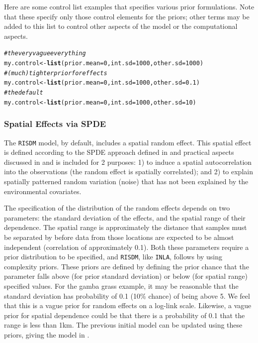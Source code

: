 \documentclass[article,shortnames,nojss]{jss}\usepackage[]{graphicx}\usepackage[]{xcolor}
\makeatletter
\newcommand{\hlnum}[1]{\textcolor[rgb]{0.686,0.059,0.569}{#1}}%
\newcommand{\hlcom}[1]{\textcolor[rgb]{0.678,0.584,0.686}{\textit{#1}}}%
\newcommand{\hlstd}[1]{\textcolor[rgb]{0.345,0.345,0.345}{#1}}%
\newcommand{\hlkwb}[1]{\textcolor[rgb]{0.69,0.353,0.396}{#1}}%
\newcommand{\hlkwc}[1]{\textcolor[rgb]{0.333,0.667,0.333}{#1}}%
\newcommand{\hlkwd}[1]{\textcolor[rgb]{0.737,0.353,0.396}{\textbf{#1}}}%
\newenvironment{kframe}{%
 \def\at@end@of@kframe{}%
 \ifinner\ifhmode%
  \def\at@end@of@kframe{\end{minipage}}%
  \begin{minipage}{\columnwidth}%
 \fi\fi%
 \def\FrameCommand##1{\hskip\@totalleftmargin \hskip-\fboxsep
 \colorbox{shadecolor}{##1}\hskip-\fboxsep
     \hskip-\linewidth \hskip-\@totalleftmargin \hskip\columnwidth}%
 \MakeFramed {\advance\hsize-\width
   \@totalleftmargin\z@ \linewidth\hsize
   \@setminipage}}%
 {\par\unskip\endMakeFramed%
 \at@end@of@kframe}
\newenvironment{knitrout}{}{} %
\makeatother
\begin{document}
Here are some control list examples that specifies various prior formulations. Note that these specify only those control elements for the priors; other terms may be added to this list to control other aspects of the model or the computational aspects.
\begin{knitrout}
\color{fgcolor}\begin{kframe}
\begin{alltt}
\hlcom{#the very vague everything}
\hlstd{my.control} \hlkwb{<-} \hlkwd{list}\hlstd{(} \hlkwc{prior.mean}\hlstd{=}\hlnum{0}\hlstd{,} \hlkwc{int.sd}\hlstd{=}\hlnum{1000}\hlstd{,} \hlkwc{other.sd}\hlstd{=}\hlnum{1000}\hlstd{)}
\hlcom{#(much) tighter prior for effects}
\hlstd{my.control} \hlkwb{<-} \hlkwd{list}\hlstd{(} \hlkwc{prior.mean}\hlstd{=}\hlnum{0}\hlstd{,} \hlkwc{int.sd}\hlstd{=}\hlnum{1000}\hlstd{,} \hlkwc{other.sd}\hlstd{=}\hlnum{0.1}\hlstd{)}
\hlcom{#the default}
\hlstd{my.control} \hlkwb{<-} \hlkwd{list}\hlstd{(} \hlkwc{prior.mean}\hlstd{=}\hlnum{0}\hlstd{,} \hlkwc{int.sd}\hlstd{=}\hlnum{1000}\hlstd{,} \hlkwc{other.sd}\hlstd{=}\hlnum{10}\hlstd{)}
\end{alltt}
\end{kframe}
\end{knitrout}

\subsubsection*{Spatial Effects via SPDE}

The \texttt{RISDM} model, by default, includes a spatial random effect. This spatial effect is defined according to the SPDE approach defined in \citet{lin11} and practical aspects discussed in \citet{lin15} and is included for 2 purposes: 1) to induce a spatial autocorrelation into the observations (the random effect is spatially correlated); and 2) to explain spatially patterned random variation (noise) that has not been explained by the environmental covariates.

The specification of the distribution of the random effects depends on two parameters: the standard deviation of the effects, and the spatial range of their dependence. The spatial range is approximately the distance that samples must be separated by before data from those locations are expected to be almost independent (correlation of approximately 0.1). Both these parameters require a prior distribution to be specified, and \texttt{RISDM}, like \texttt{INLA}, follows \citet{sim17} by using complexity priors. These priors are defined by defining the prior chance that the parameter falls above (for prior standard deviation) or below (for spatial range) specified values. For the gamba grass example, it may be reasonable that the standard deviation has probability of 0.1 (10\% chance) of being above 5. We feel that this is a vague prior for random effects on a log-link scale. Likewise, a vague prior for spatial dependence could be that there is a probability of 0.1 that the range is less than 1km. The previous initial model can be updated using these priors, giving the model in \citet{fos24}.
\end{document}

